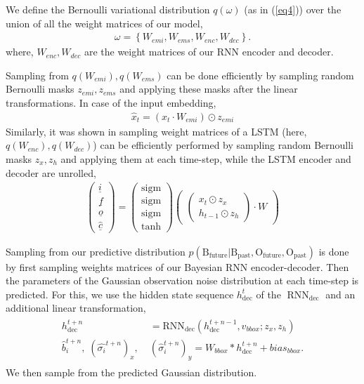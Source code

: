 We define the Bernoulli variational distribution $q(\omega)$ (as in (\ref{eq4})) over the union of all the weight matrices of our model,
\begin{align}\label{eq8}
\omega = \left\{ W_{emi}, W_{ems}, W_{enc}, W_{dec} \right\}.
\end{align}
where, $W_{enc},W_{dec}$ are the weight matrices of our RNN encoder and decoder.

Sampling from $q(W_{emi}),q(W_{ems})$ can be done efficiently by sampling random Bernoulli masks $z_{emi},z_{ems}$ and applying these masks after the linear transformations. In case of the input embedding,
\begin{align}\label{eq9}
\hat{x}_{t} = (x_{t} \cdot W_{emi}) \odot z_{emi}
\end{align}
Similarly, it was shown in \cite{gal2016theoretically} sampling weight matrices of a LSTM (here, $q(W_{enc}),q(W_{dec})$) can be efficiently performed by sampling random Bernoulli masks $z_{x},z_{h}$ and applying them at each time-step, while the LSTM encoder and decoder are unrolled,
\begin{align}\label{eq10}
\begin{pmatrix} \underline{i} \\ \underline{f} \\ \underline{o} \\ \hat{\underline{c}} \end{pmatrix}
= \begin{pmatrix} \text{sigm} \\ \text{sigm} \\ \text{sigm} \\ \text{tanh} \end{pmatrix}
\begin{pmatrix} {\begin{pmatrix} x_{t} \odot z_{x} \\ h_{t - 1} \odot z_{h}  \end{pmatrix}} \cdot W \end{pmatrix}
\end{align}

Sampling from our predictive distribution $p( \text{B}_{\text{future}} |  \text{B}_{\text{past}}, \text{O}_{\text{future}}, \text{O}_{\text{past}} )$ is done by first sampling weights matrices of our Bayesian RNN encoder-decoder. Then the parameters of the Gaussian observation noise distribution at each time-step is predicted. For this, we use the hidden state sequence $h_{\text{dec}}^{t}$ of the $\operatorname{RNN}_{\text{dec}}$ and an additional linear transformation,
\begin{align*}
    \begin{split}
        h_{\text{dec}}^{t+n} &= \text{RNN}_{\text{dec}}(h_{\text{dec}}^{t+n-1}, v_{bbox}; z_{x}, z_{h}) \\ 
        \hat{b}_{i}^{t+n},\;(\hat{\sigma_{i}}^{t+n})_{x},\;&(\hat{\sigma}_{i}^{t+n})_{y} = W_{bbox} * h_{\text{dec}}^{t+n} + bias_{bbox}.
    \end{split}
\end{align*}
We then sample from the predicted Gaussian distribution. 

